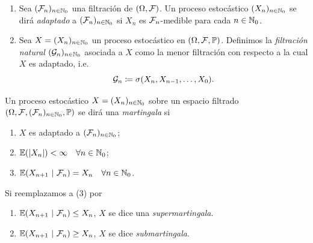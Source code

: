 \begin{definition}
	\begin{enumerate}
		\item Sea $(\mathcal{F}_{n})_{n \in \mathbb{N}_{0}}$ una filtración de $(\Omega, \mathcal{F})$. Un proceso estocástico $(X_{n})_{n \in \mathbb{N}_{0}}$ se dirá \textit{adaptado} a $(\mathcal{F}_{n})_{n \in \mathbb{N}_{0}}$ si $X_{n}$ es $\mathcal{F}_{n}$-medible para cada $n \in \mathbb{N}_{0}$.

		\item Sea $X = (X_{n})_{n \in \mathbb{N}_{0}}$ un proceso estocástico en $(\Omega, \mathcal{F}, \mathbb{P})$. Definimos la \textit{filtración natural} $(\mathcal{G}_{n})_{n \in \mathbb{N}_{0}}$ asociada a $X$ como la menor filtración con respecto a la cual $X$ es adaptado, i.e.
		\[ \mathcal{G}_{n} \coloneq \sigma(X_{n}, X_{n-1}, \dots, X_{0}). \]
	\end{enumerate}
\end{definition}

\begin{definition}
	Un proceso estocástico $X = (X_{n})_{n \in \mathbb{N}_{0}}$ sobre un espacio filtrado $(\Omega, \mathcal{F}, (\mathcal{F}_{n})_{n \in \mathbb{N}_{0}}, \mathbb{P})$ se dirá una \textit{martingala} si
	\begin{enumerate}
		\item $X$ es adaptado a $(\mathcal{F}_{n})_{n \in \mathbb{N}_{0}}$;

		\item $\mathbb{E}(|X_{n}|) < \infty \quad \forall n \in \mathbb{N}_{0}$;

		\item $\mathbb{E}(X_{n+1} \ | \ \mathcal{F}_{n}) = X_{n} \quad \forall n \in \mathbb{N}_{0}$.
	\end{enumerate}
	Si reemplazamos a (3) por
	\begin{enumerate}
		\item[$3^{+}.$] $\mathbb{E}(X_{n+1} \ | \ \mathcal{F}_{n}) \leq X_{n}$, $X$ se dice una \textit{supermartingala}.

		\item[$3^{-}.$] $\mathbb{E}(X_{n+1} \ | \ \mathcal{F}_{n}) \geq X_{n}$, $X$ se dice \textit{submartingala}.
	\end{enumerate}
\end{definition}

